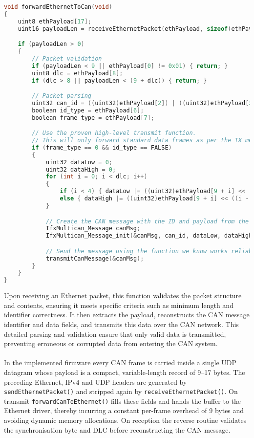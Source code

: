  
\begin{lstlisting}[language=C, caption={Ethernet to CAN message translation (Gateway.c)}, label={lst:eth_to_can}]
void forwardEthernetToCan(void)
{
    uint8 ethPayload[17];
    uint16 payloadLen = receiveEthernetPacket(ethPayload, sizeof(ethPayload));

    if (payloadLen > 0)
    {
        // Packet validation
        if (payloadLen < 9 || ethPayload[0] != 0x01) { return; }
        uint8 dlc = ethPayload[8];
        if (dlc > 8 || payloadLen < (9 + dlc)) { return; }

        // Packet parsing
        uint32 can_id = ((uint32)ethPayload[2]) | ((uint32)ethPayload[3] << 8) | ((uint32)ethPayload[4] << 16) | ((uint32)ethPayload[5] << 24);
        boolean id_type = ethPayload[6];
        boolean frame_type = ethPayload[7];

        // Use the proven high-level transmit function.
        // This will only forward standard data frames as per the TX message object's initial configuration.
        if (frame_type == 0 && id_type == FALSE)
        {
            uint32 dataLow = 0;
            uint32 dataHigh = 0;
            for (int i = 0; i < dlc; i++)
            {
                if (i < 4) { dataLow |= ((uint32)ethPayload[9 + i] << (i * 8)); }
                else { dataHigh |= ((uint32)ethPayload[9 + i] << ((i - 4) * 8)); }
            }

            // Create the CAN message with the ID and payload from the UDP packet
            IfxMultican_Message canMsg;
            IfxMultican_Message_init(&canMsg, can_id, dataLow, dataHigh, (IfxMultican_DataLengthCode)dlc);

            // Send the message using the function we know works reliably
            transmitCanMessage(&canMsg);
        }
    }
}
\end{lstlisting}
Upon receiving an Ethernet packet, this function validates the packet structure and contents, ensuring it meets specific criteria such as minimum length and identifier correctness. It then extracts the payload, reconstructs the CAN message identifier and data fields, and transmits this data over the CAN network. This detailed parsing and validation ensure that only valid data is transmitted, preventing erroneous or corrupted data from entering the CAN system.\\\\
In the implemented firmware every CAN frame is carried inside a single UDP datagram whose payload is a compact, variable-length record of 9–17 bytes. The preceding Ethernet, IPv4 and UDP headers are generated by \verb|sendEthernetPacket()| and stripped again by \verb|receiveEthernetPacket()|. On transmit \verb|forwardCanToEthernet()| fills these fields and hands the buffer to the Ethernet driver, thereby incurring a constant per-frame overhead of 9 bytes and avoiding dynamic memory allocations. On reception the reverse routine validates the synchronisation byte and DLC before reconstructing the CAN message. \\\\
